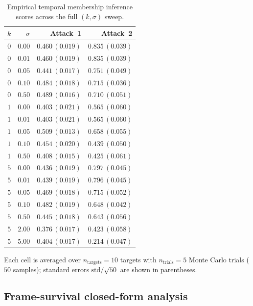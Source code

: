 \documentclass[letterpaper]{article} %
\begin{document}
\begin{table}[!htbp]
\centering\small
\caption{Empirical temporal membership inference scores across the full $(k, \sigma)$ sweep.}
\label{tab:sigma_sweep}
\begin{tabular}{rrrr}
\toprule
$k$ & $\sigma$ & Attack~1 & Attack~2 \\
\midrule
$0$ & $0.00$ & $0.460\,(0.019)$  & $0.835\,(0.039)$ \\
$0$ & $0.01$ & $0.460\,(0.019)$ & $0.835\,(0.039)$ \\
$0$ & $0.05$ & $0.441\,(0.017)$ & $0.751\,(0.049)$ \\
$0$ & $0.10$ & $0.484\,(0.018)$ & $0.715\,(0.036)$ \\
$0$ & $0.50$ & $0.489\,(0.016)$ & $0.710\,(0.051)$ \\
\midrule
$1$ & $0.00$ & $0.403\,(0.021)$ & $0.565\,(0.060)$ \\
$1$ & $0.01$ & $0.403\,(0.021)$  & $0.565\,(0.060)$ \\
$1$ & $0.05$ & $0.509\,(0.013)$ & $0.658\,(0.055)$ \\
$1$ & $0.10$ & $0.454\,(0.020)$ & $0.439\,(0.050)$ \\
$1$ & $0.50$ & $0.408\,(0.015)$ & $0.425\,(0.061)$ \\
\midrule
$5$ & $0.00$ & $0.436\,(0.019)$ & $0.797\,(0.045)$ \\
$5$ & $0.01$ & $0.439\,(0.019)$ & $0.796\,(0.045)$ \\
$5$ & $0.05$ & $0.469\,(0.018)$ & $0.715\,(0.052)$ \\
$5$ & $0.10$ & $0.482\,(0.019)$ & $0.648\,(0.042)$ \\
$5$ & $0.50$ & $0.445\,(0.018)$ & $0.643\,(0.056)$ \\
$5$ & $2.00$ & $0.376\,(0.017)$ & $0.423\,(0.058)$ \\
$5$ & $5.00$ & $0.404\,(0.017)$  & $0.214\,(0.047)$ \\
\bottomrule
\end{tabular}
\end{table}

Each cell is averaged over $n_{\mathrm{targets}} = 10$ targets with $n_{\mathrm{trials}} = 5$ Monte Carlo trials ($50$ samples); standard errors $\mathrm{std}/\sqrt{50}$ are shown in parentheses.

\subsection{Frame-survival closed-form analysis}
\label{app:frame_survival}
\end{document}
